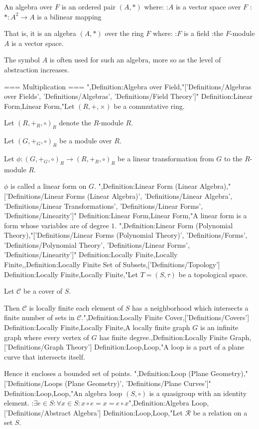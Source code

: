 An algebra over $F$ is an ordered pair $\left( A, * \right)$ where:
:$A$ is a vector space over $F$
:$* : A^2 \to A$ is a bilinear mapping


That is, it is an algebra $\left( A, * \right)$ over the ring $F$ where:
:$F$ is a field
:the $F$-module $A$ is a vector space.


The symbol $A$ is often used for such an algebra, more so as the level of abstraction increases.


=== Multiplication ===
",Definition:Algebra over Field,"['Definitions/Algebras over Fields', 'Definitions/Algebras', 'Definitions/Field Theory']"
Definition:Linear Form,Linear Form,"Let $\left( R, +, \times \right)$ be a commutative ring.

Let $\left( R, +_R, \circ \right)_R$ denote the $R$-module $R$.

Let $\left( G, +_G, \circ \right)_R$ be a module over $R$.


Let $\phi: \left( G, +_G, \circ \right)_R \to \left( R, +_R, \circ \right)_R$ be a linear transformation from $G$ to the $R$-module $R$.


$\phi$ is called a linear form on $G$.
",Definition:Linear Form (Linear Algebra),"['Definitions/Linear Forms (Linear Algebra)', 'Definitions/Linear Algebra', 'Definitions/Linear Transformations', 'Definitions/Linear Forms', 'Definitions/Linearity']"
Definition:Linear Form,Linear Form,"A linear form is a form whose variables are of degree $1$.
",Definition:Linear Form (Polynomial Theory),"['Definitions/Linear Forms (Polynomial Theory)', 'Definitions/Forms', 'Definitions/Polynomial Theory', 'Definitions/Linear Forms', 'Definitions/Linearity']"
Definition:Locally Finite,Locally Finite,,Definition:Locally Finite Set of Subsets,['Definitions/Topology']
Definition:Locally Finite,Locally Finite,"Let $T = \left( S, \tau \right)$ be a topological space.

Let $\mathcal C$ be a cover of $S$.


Then $\mathcal C$ is locally finite  each element of $S$ has a neighborhood which intersects a finite number of sets in $\mathcal C$.",Definition:Locally Finite Cover,['Definitions/Covers']
Definition:Locally Finite,Locally Finite,A locally finite graph $G$ is an infinite graph where every vertex of $G$ has finite degree.,Definition:Locally Finite Graph,['Definitions/Graph Theory']
Definition:Loop,Loop,"A loop is a part of a plane curve that intersects itself.

Hence it encloses a bounded set of points.
",Definition:Loop (Plane Geometry),"['Definitions/Loops (Plane Geometry)', 'Definitions/Plane Curves']"
Definition:Loop,Loop,"An algebra loop $\left( S, \circ \right)$ is a quasigroup with an identity element.
:$\exists e \in S: \forall x \in S: x \circ e = x = e \circ x$",Definition:Algebra Loop,['Definitions/Abstract Algebra']
Definition:Loop,Loop,"Let $\mathcal R$ be a relation on a set $S$.

